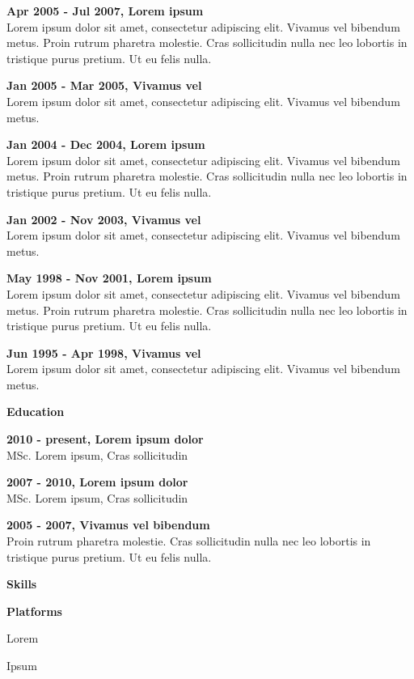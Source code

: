 \documentclass[a4paper,12pt,final]{memoir}
\newcommand{\Sep}{\vspace{1.5em}}
\newcommand{\SmallSep}{\vspace{0.5em}}
\newcommand{\CVSection}[1]
	{\Large\textbf{#1}\par
	\SmallSep\normalsize\normalfont}
\newcommand{\CVItem}[1]
	{\textbf{\color{RoyalBlue} #1}}
\begin{document}
\CVItem{Apr 2005 - Jul 2007, Lorem ipsum} \\ 
Lorem ipsum dolor sit amet, consectetur adipiscing elit. Vivamus vel bibendum metus. Proin rutrum pharetra molestie. Cras sollicitudin nulla nec leo lobortis in tristique purus pretium. Ut eu felis nulla.
\SmallSep

\CVItem{Jan 2005 - Mar 2005, Vivamus vel} \\ 
Lorem ipsum dolor sit amet, consectetur adipiscing elit. Vivamus vel bibendum metus.
\SmallSep

\CVItem{Jan 2004 - Dec 2004, Lorem ipsum} \\ 
Lorem ipsum dolor sit amet, consectetur adipiscing elit. Vivamus vel bibendum metus. Proin rutrum pharetra molestie. Cras sollicitudin nulla nec leo lobortis in tristique purus pretium. Ut eu felis nulla.
\SmallSep

\CVItem{Jan 2002 - Nov 2003, Vivamus vel} \\ 
Lorem ipsum dolor sit amet, consectetur adipiscing elit. Vivamus vel bibendum metus.
\SmallSep

\CVItem{May 1998 - Nov 2001, Lorem ipsum} \\ 
Lorem ipsum dolor sit amet, consectetur adipiscing elit. Vivamus vel bibendum metus. Proin rutrum pharetra molestie. Cras sollicitudin nulla nec leo lobortis in tristique purus pretium. Ut eu felis nulla.
\SmallSep

\CVItem{Jun 1995 - Apr 1998, Vivamus vel} \\ 
Lorem ipsum dolor sit amet, consectetur adipiscing elit. Vivamus vel bibendum metus.

\Sep

\CVSection{Education}
\CVItem{2010 - present, Lorem ipsum dolor} \\ 
MSc. Lorem ipsum, Cras sollicitudin
\SmallSep

\CVItem{2007 - 2010, Lorem ipsum dolor} \\ 
MSc. Lorem ipsum, Cras sollicitudin
\SmallSep

\clearpage
\framebreak
\framebreak

\CVItem{2005 - 2007, Vivamus vel bibendum} \\ 
Proin rutrum pharetra molestie. Cras sollicitudin nulla nec leo lobortis in tristique purus pretium. Ut eu felis nulla.
\Sep


\CVSection{Skills}
\CVItem{Platforms}
\begin{multicols}{3}
\begin{compactitem}[\color{RoyalBlue}$\circ$]
\item Lorem
\item Ipsum
\end{compactitem}
\end{multicols}
\SmallSep
\end{document}
